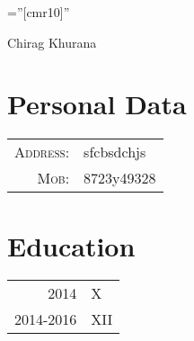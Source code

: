 \documentclass[a4paper,10pt]{article}
\begin{document}
\pagestyle{empty}
\font\fb=''[cmr10]''
\par{\centering
		{\Huge Chirag Khurana
	}\bigskip\par}
\section{Personal Data}
\begin{tabular}{rl}
\textsc{Address:}&sfcbsdchjs\\
\textsc{Mob:}&8723y49328\\
\end{tabular}
\section{Education}
\begin{tabular}{rl}
\textsc{2014}&X\\
\textsc{2014-2016}&XII\\
\end{tabular}
\end{document}
